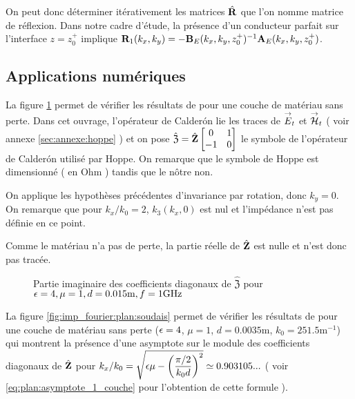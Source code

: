     On peut donc déterminer itérativement les matrices \(\hat{\mathbf{R}}\) que l'on nomme matrice de réflexion.
    Dans notre cadre d'étude, la présence d'un conducteur parfait sur l'interface \(z=z_0^+\) implique \(\mathbf{R}_{1}(k_x,k_y) = -\mathbf{B}_E(k_x,k_y,z_0^+)^{-1}\mathbf{A}_E(k_x,k_y,z_0^+)\).

\subsection{Applications numériques}

  La figure \ref{fig:imp_fourier:plan:hoppe} permet de vérifier les résultats de \cite[p.~33]{hoppe_impedance_1995} pour une couche de matériau sans perte.
  Dans cet ouvrage, l'opérateur de Calderón lie les traces de \({\overset{\rightarrow}{E}}_t\) et \({\overset{\rightarrow}{\mathcal{H}}}_t\) ( voir annexe \ref{sec:annexe:hoppe} ) et on pose \(\hat{\mathfrak{Z}} = \hat{\mathbf{Z}}\begin{bmatrix}0&1\\-1&0\end{bmatrix}\) le symbole de l'opérateur de Calderón utilisé par Hoppe.
  On remarque que le symbole de Hoppe est dimensionné ( en Ohm ) tandis que le nôtre non.

  On applique les hypothèses précédentes d'invariance par rotation, donc \(k_y=0\).
  On remarque que pour \(k_x\slash k_0=2\), \(k_3(k_x,0)\) est nul et l'impédance n'est pas définie en ce point. 

  Comme le matériau n'a pas de perte, la partie réelle de \(\hat{\mathfrak{\mathbf{Z}}}\) est nulle et n'est donc pas tracée.
  \begin{figure}[!hbt]
    \centering
    
    \caption[Reproduction résultat Hoppe & Rahmat-Samii p.~33]{Partie imaginaire des coefficients diagonaux de \(\hat{\mathfrak Z}\) pour \(\epsilon = 4, \mu = 1, d=0.015\text{m}, f=1\text{GHz}\)}
    \label{fig:imp_fourier:plan:hoppe}
  \end{figure}

  La figure \ref{fig:imp_fourier:plan:soudais} permet de vérifier les résultats de \cite{soudais_3d_2017} pour une couche de matériau sans perte (\(\epsilon = 4\), \(\mu = 1\), \(d=0.0035\text{m}\), \(k_0=251.5\text{m}^{-1}\)) qui montrent la présence d'une asymptote sur le module des coefficients diagonaux de \(\hat{\mathbf{Z}}\) pour \(k_x\slash k_0 = \sqrt{\epsilon \mu - \left(\dfrac{\pi/2}{k_0 d}\right)^2} \simeq 0.903105...\)
  ( voir \eqref{eq:plan:asymptote_1_couche} pour l'obtention de cette formule ). 

